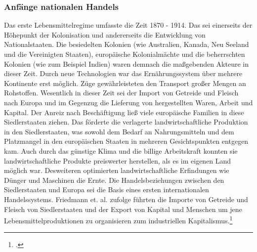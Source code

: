 \documentclass{scrartcl}
\begin{document}
\subsubsection*{Anfänge nationalen Handels}
Das erste Lebensmittelregime umfasste die Zeit 1870 - 1914. Das sei einerseits der Höhepunkt der Kolonisation und andererseits die Entwicklung von Nationalstaaten. Die besiedelten Kolonien (wie Australien, Kanada, Neu Seeland und die Vereinigten Staaten), europäische Kolonialmächte und die beherrschten Kolonien (wie zum Beispiel Indien) waren demnach die maßgebenden Akteure in dieser Zeit. Durch neue Technologien war das Ernährungssystem über mehrere Kontinente erst möglich. Züge gewährleisteten den Transport großer Mengen an Rohstoffen. Wesentlich in dieser Zeit sei der Import von Getreide und Fleisch nach Europa und im Gegenzug die Lieferung von hergestellten Waren, Arbeit und Kapital. Der Anreiz nach Beschäftigung ließ viele europäische Familien in diese Siedlerstaaten ziehen. Das förderte die verlagerte landwirtschaftliche Produktion in den Siedlerstaaten, was sowohl dem Bedarf an Nahrungsmitteln und dem Platzmangel in den europäischen Staaten in mehreren Gesichtspunkten entgegen kam. Auch durch das günstige Klima und die billige Arbeitskraft konnten sie landwirtschaftliche Produkte preiswerter herstellen, als es im eigenen Land möglich war. Desweiteren optimierten landwirtschaftliche Erfindungen wie Dünger und Maschinen die Ernte. Die Handelsbeziehungen zwischen den Siedlerstaaten und Europa sei die Basis eines ersten internationalen Handelssystems. Friedmann et. al. zufolge führten die Importe von Getreide und Fleisch von Siedlerstaaten und der Export von Kapital und Menschen um jene Lebensmittelproduktionen zu organisieren zum industriellen Kapitalismus.\footcite[Vgl.][S.96ff]{Friedmann1989AGRICULTUREPresent}
\end{document}
